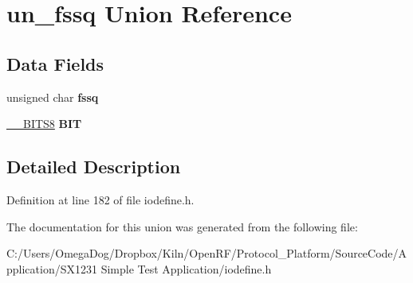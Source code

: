 \hypertarget{unionun__fssq}{\section{un\-\_\-fssq Union Reference}
\label{unionun__fssq}
}
\subsection*{Data Fields}
\begin{DoxyCompactItemize}
\item 
\hypertarget{unionun__fssq_aa3f66214075e1f7bc15fb98b17f854ec}{unsigned char {\bfseries fssq}}\label{unionun__fssq_aa3f66214075e1f7bc15fb98b17f854ec}

\item 
\hypertarget{unionun__fssq_af544b19c1918dd9c8ed854595d6226a3}{\hyperlink{struct_____b_i_t_s8}{\-\_\-\-\_\-\-B\-I\-T\-S8} {\bfseries B\-I\-T}}\label{unionun__fssq_af544b19c1918dd9c8ed854595d6226a3}

\end{DoxyCompactItemize}


\subsection{Detailed Description}


Definition at line 182 of file iodefine.\-h.



The documentation for this union was generated from the following file\-:\begin{DoxyCompactItemize}
\item 
C\-:/\-Users/\-Omega\-Dog/\-Dropbox/\-Kiln/\-Open\-R\-F/\-Protocol\-\_\-\-Platform/\-Source\-Code/\-Application/\-S\-X1231 Simple Test Application/iodefine.\-h\end{DoxyCompactItemize}
